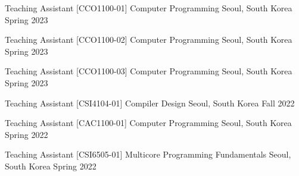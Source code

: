 

\begin{cventries}

  \cventry
    {Teaching Assistant} %
    {[CCO1100-01] Computer Programming} %
    {Seoul, South Korea} %
    {Spring 2023} %
    {}

  \cventry
    {Teaching Assistant} %
    {[CCO1100-02] Computer Programming} %
    {Seoul, South Korea} %
    {Spring 2023} %
    {}

  \cventry
    {Teaching Assistant} %
    {[CCO1100-03] Computer Programming} %
    {Seoul, South Korea} %
    {Spring 2023} %
    {}

  \cventry
    {Teaching Assistant} %
    {[CSI4104-01] Compiler Design} %
    {Seoul, South Korea} %
    {Fall 2022} %
    {}

  \cventry
    {Teaching Assistant} %
    {[CAC1100-01] Computer Programming} %
    {Seoul, South Korea} %
    {Spring 2022} %
    {}

  \cventry
    {Teaching Assistant} %
    {[CSI6505-01] Multicore Programming Fundamentals} %
    {Seoul, South Korea} %
    {Spring 2022} %
    {}
\end{cventries}

